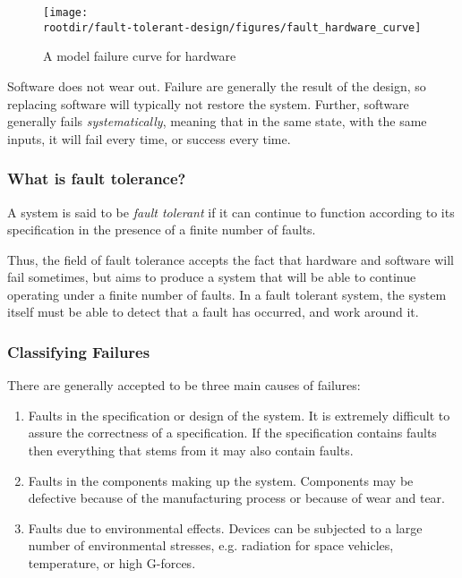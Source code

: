 \begin{figure}[!h]
\centering
  \texttt{[image: \\rootdir/fault-tolerant-design/figures/fault\_hardware\_curve]}
  \caption{A model failure curve for hardware}
 \label{fig:fault-tolerance:hardware-failure}
\end{figure}

Software does not wear out. Failure are generally the result of the design, so replacing software will typically not restore the system. Further, software generally fails \emph{systematically}, meaning that in the same state, with the same inputs, it will fail every time, or success every time.

\subsubsection*{What is fault tolerance?}

 A system is said to be {\em fault tolerant} if it can continue to function according to its specification in the presence of a finite number of faults.

Thus, the field of fault tolerance accepts the fact that hardware and software will fail sometimes, but aims to produce a system that will be able to continue operating under a finite number of faults. In a fault tolerant system, the system itself must be able to detect that a fault has occurred, and work around it.


\subsubsection*{Classifying Failures}


There are generally accepted to be three main causes of failures:

\begin{enumerate}

\item Faults in the specification or design of the system. It is extremely difficult to assure the correctness of a specification. If the specification contains faults then everything that stems from it may also contain faults.

\item Faults in the components making up the system.
Components may be defective because of the manufacturing process or
because of wear and tear.

\item Faults due to environmental effects. Devices can be
subjected to a large number of environmental stresses, e.g. radiation
for space vehicles, temperature, or high G-forces. 

\end{enumerate}


